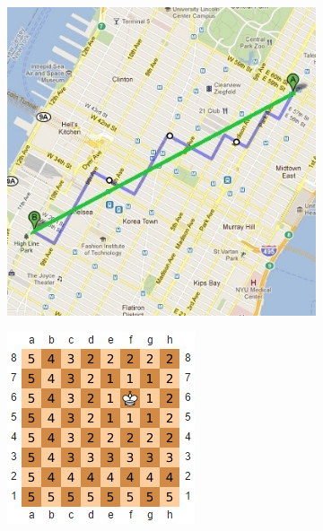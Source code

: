 \documentclass{VUMIFInfKursinis}
\begin{document}
\begin{figure}[H]
  \centering
  \begin{subfigure}[b]{0.4\textwidth}
  \includegraphics[width=\textwidth]{img/MvsE}
  \caption{}
  \end{subfigure}
  \begin{subfigure}[b]{0.4\textwidth}
  \includegraphics[width=\textwidth]{img/cheb}

\end{subfigure}
\end{figure}
\end{document}
